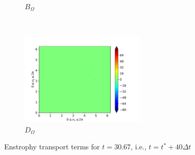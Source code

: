 \begin{figure}[H]
\begin{subfigure}{0.45\textwidth}
        \caption{$B_{\Omega}$}
    \end{subfigure}
    ~
    \begin{subfigure}{0.45\textwidth}
        \includegraphics[height=1.75in]{media/run-cds-65/D-enst-1380}
        \caption{$D_{\Omega}$}
    \end{subfigure}
    \caption{Enstrophy transport terms for $t=30.67$, i.e., $t=t^{\ast} + 40 \Delta t$}
\end{figure}

\newpage

